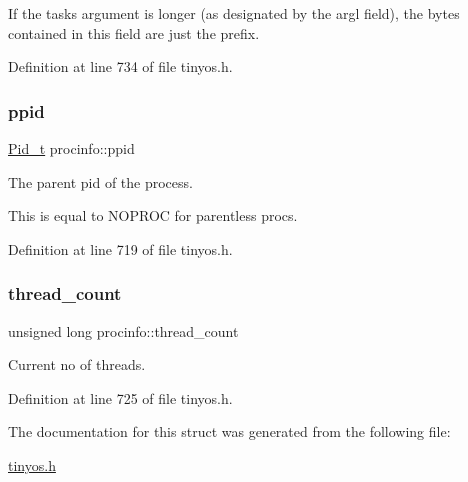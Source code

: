 If the task\textquotesingle{}s argument is longer (as designated by the {\ttfamily argl} field), the bytes contained in this field are just the prefix. 

Definition at line 734 of file tinyos.\+h.

\mbox{\label{structprocinfo_a790970c70987013b2712b7dd6d2b75b9}} 
\subsubsection{\texorpdfstring{ppid}{ppid}}
{\footnotesize\ttfamily \hyperlink{group__syscalls_gafac07f3170763932fac97b6eab2c3984}{Pid\+\_\+t} procinfo\+::ppid}



The parent pid of the process. 

This is equal to N\+O\+P\+R\+OC for parentless procs. 

Definition at line 719 of file tinyos.\+h.

\mbox{\label{structprocinfo_ae1ed3afa8904729a1daf1b51780cf2cf}} 
\subsubsection{\texorpdfstring{thread\+\_\+count}{thread\_count}}
{\footnotesize\ttfamily unsigned long procinfo\+::thread\+\_\+count}

Current no of threads. 

Definition at line 725 of file tinyos.\+h.



The documentation for this struct was generated from the following file\+:\begin{DoxyCompactItemize}
\item 
\hyperlink{tinyos_8h}{tinyos.\+h}\end{DoxyCompactItemize}
